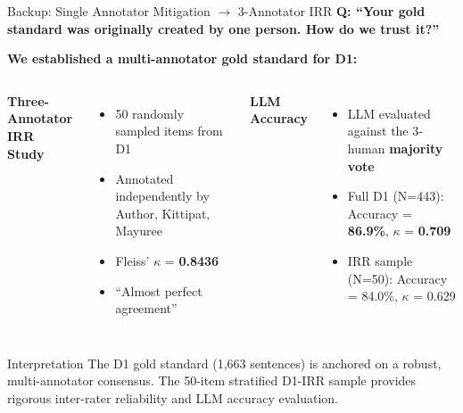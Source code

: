 \documentclass[aspectratio=169, 10pt]{beamer}
\begin{document}
\begin{frame}{Backup: Single Annotator Mitigation $\rightarrow$ 3-Annotator IRR}
    \textbf{Q: ``Your gold standard was originally created by one person. How do we trust it?''}

    \vspace{0.3cm}
    \textbf{We established a multi-annotator gold standard for D1:}

    \vspace{0.2cm}
    \begin{columns}
        \textbf{Three-Annotator IRR Study}
        \begin{itemize}
            \item 50 randomly sampled items from D1
            \item Annotated independently by Author, Kittipat, Mayuree
            \item Fleiss' $\kappa$ = \textbf{0.8436}
            \item ``Almost perfect agreement''
        \end{itemize}

        \textbf{LLM Accuracy}
        \begin{itemize}
            \item LLM evaluated against the 3-human \textbf{majority vote}
            \item Full D1 (N=443): Accuracy = \textbf{86.9\%}, $\kappa$ = \textbf{0.709}
            \item IRR sample (N=50): Accuracy = 84.0\%, $\kappa$ = 0.629
        \end{itemize}
    \end{columns}

    \vspace{0.4cm}
    \begin{exampleblock}{Interpretation}
        The D1 gold standard (1,663 sentences) is anchored on a robust, multi-annotator consensus. The 50-item stratified D1-IRR sample provides rigorous inter-rater reliability and LLM accuracy evaluation.
    \end{exampleblock}
\end{frame}
\end{document}
